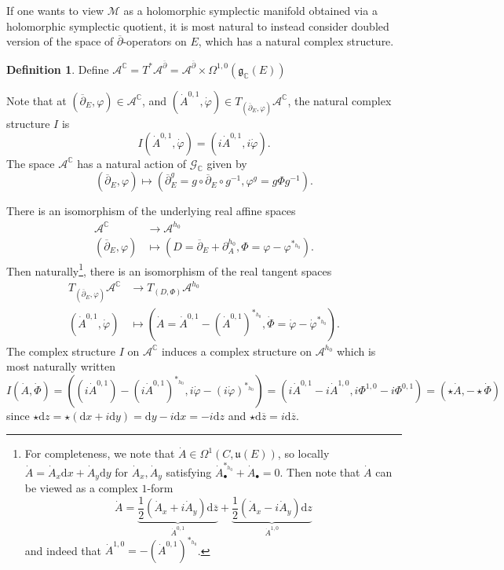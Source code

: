 \documentclass[12pt,letterpaper,reqno]{amsart}
\theoremstyle{remark}
\theoremstyle{definition}
\newtheorem{defn}[thm]{Definition}
\numberwithin{thm}{section}
\numberwithin{equation}{section}
\numberwithin{figure}{section}
\newcommand{\C}{\ensuremath{\mathbb C}}
\newcommand{\delbar}{\ensuremath{\overline{\partial}}}
\newcommand{\zbar}{{\ensuremath{\overline{z}}}}
\newcommand{\de}{\mathrm{d}}
\newcommand{\del}{{\partial}}
\begin{document}
If one wants to view  $\mathcal{M}$ as a holomorphic symplectic manifold obtained via a holomorphic symplectic quotient, it is most natural to instead consider doubled version of the space of $\delbar$-operators on $E$, which has a natural complex structure. 
\begin{defn}
Define $\mathcal{A}^{\mathbb{C}}= T^* \mathcal{A}^{\delbar} = \mathcal{A}^{\delbar} \times \Omega^{1,0}( \mathfrak{g}_\C(E))$
\end{defn}
Note that at $(\delbar_E, \varphi) \in \mathcal{A}^{\mathbb{C}}$, and  $(\dot{A}^{0,1}, \dot{\varphi}) \in T_{(\delbar_E, \varphi)} \mathcal{A}^{\mathbb{C}}$, the natural complex structure $I$ is 
\[I(\dot{A}^{0,1}, \dot{\varphi}) =(i \dot{A}^{0,1}, i \dot{\varphi}). \]
The space $\mathcal{A}^{\mathbb{C}}$ has a natural action of $\mathcal{G}_{\C}$ given by 
\[(\delbar_E, \varphi) \mapsto (\delbar_E^g= g \circ \delbar_E \circ g^{-1}, \varphi^g = g \Phi g^{-1}). \]

There is an isomorphism of the underlying real affine spaces 
\begin{align}
\mathcal{A}^{\mathbb{C}} &\to \mathcal{A}^{h_0} \\ \nonumber 
(\delbar_E, \varphi) &\mapsto (D = \delbar_E + \del_A^{h_0}, \Phi = \varphi - \varphi^{*_{h_0}}). 
\end{align}
Then naturally\footnote{For completeness, we note that $\dot{A} \in \Omega^1(C, \mathfrak{u}(E))$, so locally $\dot{A} = \dot{A}_x \de x + \dot{A}_y \de y$ for $\dot{A}_x, \dot{A}_y$ satisfying $\dot{A}_\bullet^{*_{h_0}} + \dot{A}_\bullet =0$. Then note that $\dot{A}$ can be viewed as a complex $1$-form 
\[\dot{A} = \underbrace{ \frac{1}{2}(\dot{A}_x +i \dot{A}_y) \de \zbar}_{\dot{A}^{0,1}} + \underbrace{ \frac{1}{2}(\dot{A}_x - i \dot{A}_y) \de z}_{\dot{A}^{1,0}}  
 \]
 and indeed that $\dot{A}^{1,0} = - (\dot{A}^{0,1})^{*_{h_0}}$.
}, there is an isomorphism of the real tangent spaces 
\begin{align}
T_{(\delbar_E, \varphi)} \mathcal{A}^{\mathbb{C}} &\to T_{(D, \Phi)} \mathcal{A}^{h_0} \\ \nonumber 
(\dot{A}^{0,1}, \dot \varphi) &\mapsto (\dot{A} = \dot{A}^{0,1} - (\dot{A}^{0,1})^{*_{h_0}}, \dot \Phi = \dot \varphi - \dot \varphi^{*_{h_0}}). 
\end{align}
The complex structure $I$ on $\mathcal{A}^{\mathbb{C}}$ induces a complex structure on $\mathcal{A}^{h_0}$ which is most naturally written\[ I (\dot{A}, \dot{\Phi})  = ( (i \dot{A}^{0,1}) - (i \dot{A}^{0,1})^{*_{h_0}}, i \dot{\varphi} - (i \dot{\varphi})^{*_{h_0}}) = (i \dot{A}^{0,1} - i \dot{A}^{1,0}, i \Phi^{1,0} - i \Phi^{0,1}) =(\star \dot{A}, -\star \dot{\Phi}) \]
since $\star \de z = \star (\de x + i \de y) = \de y  - i \de x = -i \de z$ and $\star \de \zbar = i \de \zbar$.
\end{document}
